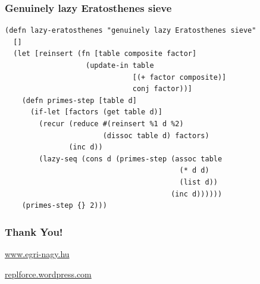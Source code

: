 \documentclass{beamer}
\begin{document}
\begin{frame}[fragile]
\frametitle{Genuinely lazy Eratosthenes sieve}
\begin{verbatim}
(defn lazy-eratosthenes "genuinely lazy Eratosthenes sieve"
  []
  (let [reinsert (fn [table composite factor]
                   (update-in table
                              [(+ factor composite)]
                              conj factor))]
    (defn primes-step [table d]
      (if-let [factors (get table d)]
        (recur (reduce #(reinsert %1 d %2)
                       (dissoc table d) factors)
               (inc d))
        (lazy-seq (cons d (primes-step (assoc table
                                         (* d d)
                                         (list d))
                                       (inc d))))))
    (primes-step {} 2)))
\end{verbatim}
\end{frame}

\begin{frame}\frametitle{Thank You!}
\begin{center}
\huge
\url{www.egri-nagy.hu}

\url{replforce.wordpress.com}

\end{center}
\end{frame}
\end{document}
